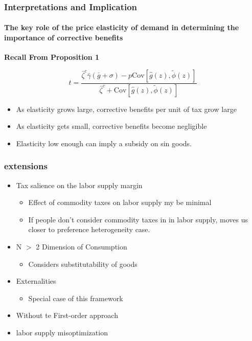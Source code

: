 \documentclass{beamer}
\newcommand{\Cov}{\mathrm{Cov}}
\begin{document}
\begin{frame}
\frametitle{Interpretations and Implication}
\framesubtitle{The key role of the price elasticity of demand in determining the importance of corrective benefits}

\textbf{Recall From Proposition 1} 

$$ t = \frac{\bar{\zeta}^c \bar{\gamma} (\bar{g}  + \sigma) - p\Cov \left[ \hat{g}(z),\tilde{\phi}(z) \right]}{\bar{\zeta}^c + \Cov \left[\hat{g}(z), \tilde{\phi}(z) \right]}$$ 

\begin{itemize}
	\item As elasticity grows large, corrective benefits per unit of tax grow large
	\item As elasticity gets small, corrective benefits become negligible
	\item Elasticity low enough can imply a subsidy on sin goods.
\end{itemize}


\end{frame}




\begin{frame}
\frametitle{extensions} 
\begin{itemize}
	\item Tax salience on the labor supply margin 
	\begin{itemize}
		\item Effect of commodity taxes on labor supply my be minimal 
		\item If people don't consider commodity taxes in in labor supply, moves us closer to preference heterogeneity case.
	\end{itemize}
	\item N $>$ 2 Dimension of Consumption 
	\begin{itemize}
		\item Considers substitutability of goods
	\end{itemize}
	\item Externalities 
	\begin{itemize}
		\item Special case of this framework 
	\end{itemize}
	\item Without te First-order approach
	\item labor supply misoptimization 
\end{itemize}

\end{frame}
\end{document}
